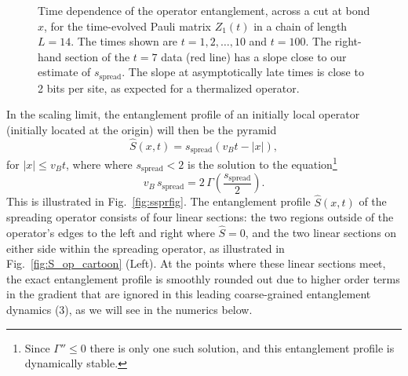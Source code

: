 \documentclass[aps,prx,twocolumn,superscriptaddress,floatfix,nofootinbib,prx]{revtex4}
\newcommand{\f}{\frac}
\renewcommand{\>}{\right\rangle}
\newcommand{\<}{\left\langle}
\newcommand{\be}{\begin{equation}}
\newcommand{\ee}{\end{equation}}
\newcommand{\lf}{\left(}
\newcommand{\ri}{\right)}
\newcommand{\sspr}{s_\text{spread}}
\begin{document}
\begin{figure}[t]
\caption{
Time dependence of the operator entanglement, across a cut at bond $x$, for the time-evolved Pauli matrix $Z_1(t)$ in a chain of length $L=14$. The times shown are $t=1,2,\ldots,10$ and $t=100$. The right-hand section of the $t=7$ data (red line) has a slope close to our  estimate of $\sspr$. The slope at asymptotically late times is close to 2 bits per site, as expected for a thermalized operator.
}  \label{fig:SZ1}
\end{figure}

In the scaling limit, the entanglement profile of an initially local operator (initially located at the origin) will then be the pyramid 
\be\label{operator_pyramid}
\hat S(x,t)=\sspr (v_B t - |x|),
\ee
for $|x|\leq v_B t$, where  where $\sspr<2$ is the solution to the equation\footnote{Since $\Gamma''\leq0$ there is only one such solution, and this entanglement profile is  dynamically stable.}
\be\label{eq:sspreq}
v_B \, \sspr= 2 \, \Gamma \lf \f{\sspr}{2} \ri.
\ee
This is illustrated in Fig.~\ref{fig:ssprfig}.  
The entanglement profile $\hat S(x,t)$ of the spreading operator consists of four linear sections: the two regions outside of the operator's edges to the left and right where $\hat S=0$, and the two linear sections on either side within the spreading operator, as illustrated in Fig.~\ref{fig:S_op_cartoon} (Left).  At the points where these linear sections meet, the exact entanglement profile is smoothly rounded out due to higher order terms in the gradient \cite{nahum} that are ignored in this leading coarse-grained entanglement dynamics (3), as we will see in the numerics below. 
\end{document}
